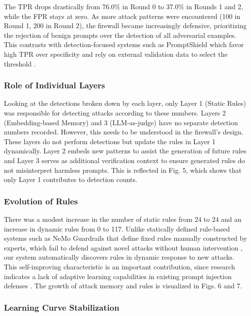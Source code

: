 \documentclass[10pt, conference, compsoc]{IEEEtran}
\begin{document}
The TPR drops drastically from 76.0\% in Round 0 to 37.0\% in Rounds 1 and 2, while the FPR stays at zero. As more attack patterns were encountered (100 in Round 1, 200 in Round 2), the firewall became increasingly defensive, prioritizing the rejection of benign prompts over the detection of all adversarial examples. This contrasts with detection-focused systems such as PromptShield which favor high TPR over specificity and rely on external validation data to select the threshold \cite{jacob2024promptshield}.

\subsubsection{Role of Individual Layers}

Looking at the detections broken down by each layer, only Layer 1 (Static Rules) was responsible for detecting attacks according to these numbers. Layers 2 (Embedding-based Memory) and 3 (LLM-as-judge) have no separate detection numbers recorded. However, this needs to be understood in the firewall's design. These layers do not perform detections but update the rules in Layer 1 dynamically. Layer 2 embeds new patterns to assist the generation of future rules and Layer 3 serves as additional verification context to ensure generated rules do not misinterpret harmless prompts. This is reflected in Fig. 5, which shows that only Layer 1 contributes to detection counts.

\subsubsection{Evolution of Rules}

There was a modest increase in the number of static rules from 24 to 24 and an increase in dynamic rules from 0 to 117. Unlike statically defined rule-based systems such as NeMo Guardrails that define fixed rules manually constructed by experts, which fail to defend against novel attacks without human intervention \cite{rebedea2023nemoguardrails}, our system automatically discovers rules in dynamic response to new attacks. This self-improving characteristic is an important contribution, since research indicates a lack of adaptive learning capabilities in existing prompt injection defenses \cite{jacob2024promptshield, yao2025controlnet, chen2025detect_indirect}. The growth of attack memory and rules is visualized in Figs. 6 and 7.

\subsubsection{Learning Curve Stabilization}
\end{document}
